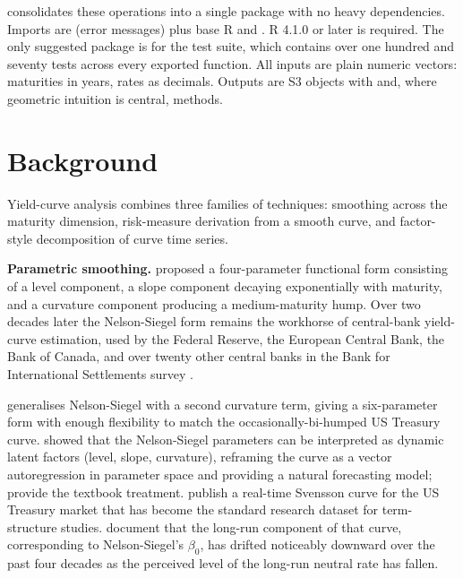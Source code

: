  consolidates these operations into a single
package with no heavy dependencies. Imports are 
(error messages) plus base R  and . R
4.1.0 or later is required. The only suggested package is
 for the test suite, which contains over one
hundred and seventy tests across every exported function. All
inputs are plain numeric vectors: maturities in years, rates as
decimals. Outputs are S3 objects with  and, where
geometric intuition is central,  methods.

\section{Background}\label{background}

Yield-curve analysis combines three families of techniques:
smoothing across the maturity dimension, risk-measure derivation
from a smooth curve, and factor-style decomposition of curve time
series.

\textbf{Parametric smoothing.} \citet{nelson1987parsimonious} proposed a
four-parameter functional form consisting of a level component, a
slope component decaying exponentially with maturity, and a
curvature component producing a medium-maturity hump. Over two
decades later the Nelson-Siegel form remains the workhorse of
central-bank yield-curve estimation, used by the Federal Reserve,
the European Central Bank, the Bank of Canada, and over twenty
other central banks in the Bank for International Settlements
survey \citep{bis2005zero}.

\citet{svensson1994estimating} generalises Nelson-Siegel with a second
curvature term, giving a six-parameter form with enough flexibility
to match the occasionally-bi-humped US Treasury curve.
\citet{diebold2006forecasting} showed that the Nelson-Siegel parameters
can be interpreted as dynamic latent factors (level, slope,
curvature), reframing the curve as a vector autoregression in
parameter space and providing a natural forecasting model;
\citet{diebold2013yield} provide the textbook treatment. \citet{gurkaynak2007us}
publish a real-time Svensson curve for the US Treasury market that
has become the standard research dataset for term-structure
studies. \citet{bauer2020interest} document that the long-run component
of that curve, corresponding to Nelson-Siegel's \(\beta_0\), has
drifted noticeably downward over the past four decades as the
perceived level of the long-run neutral rate has fallen.

